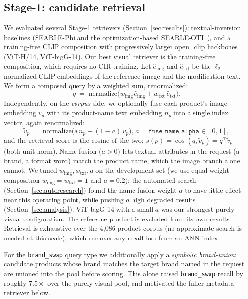 \documentclass[sigconf,nonacm]{acmart}
\begin{document}
\subsection{Stage-1: candidate retrieval}
\label{sec:stage1}
We evaluated several Stage-1 retrievers (Section~\ref{sec:results}):
textual-inversion baselines (SEARLE-Phi and the optimization-based
SEARLE-OTI~\cite{searle}), and a training-free CLIP composition with
progressively larger open\_clip backbones~\cite{openclip} (ViT-H/14,
ViT-bigG-14). Our best visual retriever is the training-free composition,
which requires no CIR training. Let $\hat{e}_\text{img}$ and
$\hat{e}_\text{txt}$ be the $\ell_2$-normalized CLIP embeddings of the
reference image and the modification text. We form a composed query by a
weighted sum, renormalized:
\[
q \;=\; \text{normalize}\!\big(w_\text{img}\,\hat{e}_\text{img}
        + w_\text{txt}\,\hat{e}_\text{txt}\big).
\]
Independently, on the \emph{corpus} side, we optionally fuse each product's
image embedding $v_p$ with its product-name text embedding $n_p$ into a
single index vector, again renormalized:
\[
\tilde{v}_p \;=\; \text{normalize}\!\big(a\,n_p + (1-a)\,v_p\big),
\, a=\texttt{fuse\_name\_alpha}\in[0,1],
\]
and the retrieval score is the cosine of the two:
$s(p)=\cos(q,\tilde{v}_p)=q^{\!\top}\tilde{v}_p$ (both unit-norm). Name
fusion ($a>0$) lets textual attributes in the request (a brand, a format
word) match the product name, which the image branch alone cannot. We tuned
$w_\text{img},w_\text{txt},a$ on the development set (we use equal-weight
composition $w_\text{img}{=}w_\text{txt}{=}1$ and $a{=}0.2$); the automated
search (Section~\ref{sec:autoresearch}) found the name-fusion weight $a$ to
have little effect near this operating point, while pushing $a$ high degraded
results (Section~\ref{sec:analysis}). ViT-bigG-14 with a small $a$ was our
strongest purely visual configuration.
The reference product is excluded from its own results. Retrieval is
exhaustive over the 4{,}086-product corpus (no approximate search is needed
at this scale), which removes any recall loss from an ANN index.

For the \texttt{brand\_swap} query type we additionally apply a
\emph{symbolic brand-union}: candidate products whose brand matches the
target brand named in the request are unioned into the pool before scoring.
This alone raised \texttt{brand\_swap} recall by roughly $7.5\times$ over the
purely visual pool, and motivated the fuller metadata retriever below.
\end{document}
